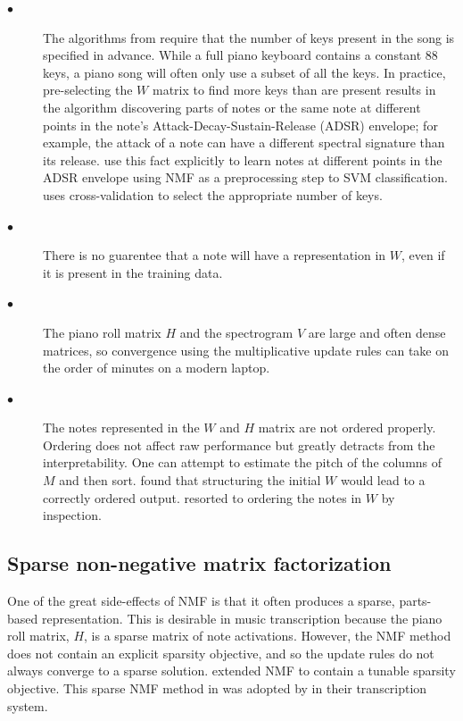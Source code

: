 \documentclass[5p]{elsarticle}
\begin{document}
\begin{description}
\item[$\bullet$] The algorithms from \citet{seung2001algorithms} require that the number of keys present in the song is specified in advance. While a full piano keyboard contains a constant 88 keys, a piano song will often only use a subset of all the keys. In practice, pre-selecting the $W$ matrix to find more keys than are present results in the algorithm discovering parts of notes or the same note at different points in the note's Attack-Decay-Sustain-Release (ADSR) envelope; for example, the attack of a note can have a different spectral signature than its release. \citet{weninger2013discriminative} use this fact explicitly to learn notes at different points in the ADSR envelope using NMF as a preprocessing step to SVM classification. \citet{} uses cross-validation to select the appropriate number of keys.
\item[$\bullet$] There is no guarentee that a note will have a representation in $W$, even if it is present in the training data.
\item[$\bullet$] The piano roll matrix $H$ and the spectrogram $V$ are large and often dense matrices, so convergence using the multiplicative update rules can take on the order of minutes on a modern laptop.
\item[$\bullet$] The notes represented in the $W$ and $H$ matrix are not ordered properly. Ordering does not affect raw performance but greatly detracts from the interpretability. One can attempt to estimate the pitch of the columns of $M$ and then sort. \citet{abdallah2004polyphonic} found that structuring the initial $W$ would lead to a correctly ordered output. \citet{boulangerlewandowski2012} resorted to ordering the notes in $W$ by inspection.
\end{description}

\subsection{Sparse non-negative matrix factorization}

One of the great side-effects of NMF is that it often produces a sparse, parts-based representation. This is desirable in music transcription because the piano roll matrix, $H$, is a sparse matrix of note activations. However, the NMF method does not contain an explicit sparsity objective, and so the update rules do not always converge to a sparse solution. \citet{hoyer2004non} extended NMF to contain a tunable sparsity objective. This sparse NMF method in \citet{hoyer2004non} was adopted by \citet{abdallah2004polyphonic} in their transcription system.
\end{document}
